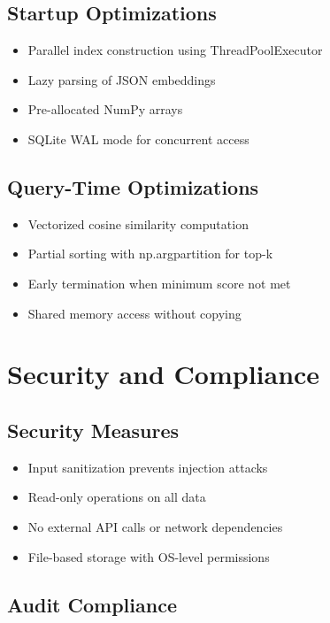 \subsection{Startup Optimizations}

\begin{itemize}[leftmargin=*,itemsep=2pt,topsep=2pt]
  \item Parallel index construction using ThreadPoolExecutor
  \item Lazy parsing of JSON embeddings
  \item Pre-allocated NumPy arrays
  \item SQLite WAL mode for concurrent access
\end{itemize}

\subsection{Query-Time Optimizations}

\begin{itemize}[leftmargin=*,itemsep=2pt,topsep=2pt]
  \item Vectorized cosine similarity computation
  \item Partial sorting with np.argpartition for top-k
  \item Early termination when minimum score not met
  \item Shared memory access without copying
\end{itemize}

\section{Security and Compliance}

\subsection{Security Measures}

\begin{itemize}[leftmargin=*,itemsep=2pt,topsep=2pt]
  \item Input sanitization prevents injection attacks
  \item Read-only operations on all data
  \item No external API calls or network dependencies
  \item File-based storage with OS-level permissions
\end{itemize}

\subsection{Audit Compliance}

